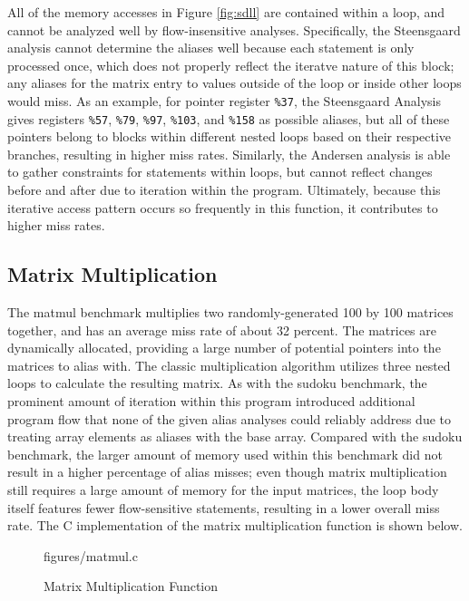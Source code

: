 All of the memory accesses in Figure \ref{fig:sdll} are contained within a loop, and cannot be analyzed well by flow-insensitive analyses. Specifically, the Steensgaard analysis cannot determine the aliases well because each statement is only processed once, which does not properly reflect the iteratve nature of this block; any aliases for the matrix entry to values outside of the loop or inside other loops would miss. As an example, for pointer register \texttt{\%37}, the Steensgaard Analysis gives registers \texttt{\%57}, \texttt{\%79}, \texttt{\%97}, \texttt{\%103}, and \texttt{\%158} as possible aliases, but all of these pointers belong to blocks within different nested loops based on their respective branches, resulting in higher miss rates. Similarly, the Andersen analysis is able to gather constraints for statements within loops, but cannot reflect changes before and after due to iteration within the program. Ultimately, because this iterative access pattern occurs so frequently in this function, it contributes to higher miss rates.

\subsection{Matrix Multiplication}
The matmul benchmark multiplies two randomly-generated 100 by 100 matrices together, and has an average miss rate of about 32 percent. The matrices are dynamically allocated, providing a large number of potential pointers into the matrices to alias with. The classic multiplication algorithm utilizes three nested loops to calculate the resulting matrix. As with the sudoku benchmark, the prominent amount of iteration within this program introduced additional program flow that none of the given alias analyses could reliably address due to treating array elements as aliases with the base array. Compared with the sudoku benchmark, the larger amount of memory used within this benchmark did not result in a higher percentage of alias misses; even though matrix multiplication still requires a large amount of memory for the input matrices, the loop body itself features fewer flow-sensitive statements, resulting in a lower overall miss rate. The C implementation of the matrix multiplication function is shown below.

\begin{figure} [h!]
   {figures/matmul.c}
  \caption{Matrix Multiplication Function}
  \label{fig:mmc}
\end{figure}

